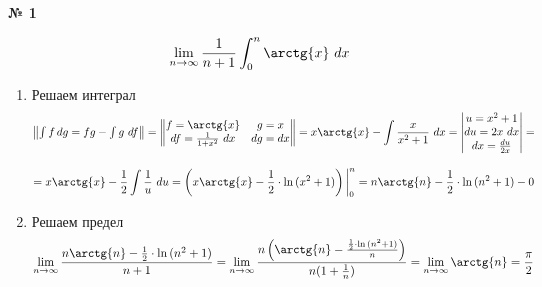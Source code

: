 \documentclass{article}
\begin{document}
\textbf{№ 1} 

$$ \lim\limits_{n \to \infty} \frac{1}{n+1} \int_{0}^{n} \arctg{x} \ dx $$

\begin{enumerate}
\item Решаем интеграл
$$ \begin{Vmatrix} \int f \,dg = fg - \int g \ df \end{Vmatrix} =
  \begin{Vmatrix} f = \arctg{x} &  g = x \\
                 df = \frac{1}{1+x^2} \ dx  & dg = dx \end{Vmatrix} 
= x\arctg{x} - \int \frac{x}{x^2+1} \ dx
= \begin{vmatrix} u = x^2+1 \\
                 du = 2x \ dx \\
                 dx = \frac{du}{2x} \end{vmatrix} 
= $$

$$ = x\arctg{x} - \frac{1}{2} \int \frac{1}{u} \ du
= \left( x\arctg{x} - \frac{1}{2}\cdot\ln{(x^2+1)} \right) \bigg\vert_{0}^{n} 
= n\arctg{n} - \frac{1}{2}\cdot\ln{(n^2+1)} - 0 $$

\item Решаем предел
$$ \lim\limits_{n \to \infty} \frac{n\arctg{n} - \frac{1}{2}\cdot\ln{(n^2+1)}}{n+1} 
= \lim\limits_{n \to \infty} \frac{n \left( \arctg{n} - \frac{\frac{1}{2}\cdot\ln{(n^2+1)}}{n} \right)}{n(1+\frac{1}{n})} 
= \lim\limits_{n \to \infty} \arctg{n}
= \frac{\pi}{2} $$

\end{enumerate}
\end{document}
